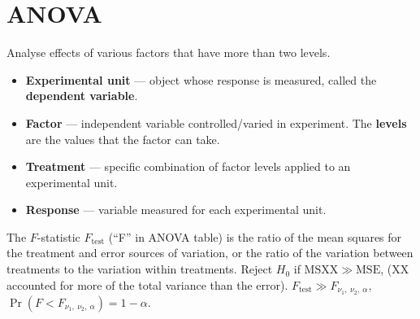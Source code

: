 \documentclass{article}
\begin{document}
\section{ANOVA}
Analyse effects of various factors that have more than two levels.
\begin{itemize}
    \item \textbf{Experimental unit} --- object whose response is measured, called the \textbf{dependent variable}.
    \item \textbf{Factor} --- independent variable controlled/varied in experiment. The \textbf{levels} are the values that the factor can take.
    \item \textbf{Treatment} --- specific combination of factor levels applied to an experimental unit.
    \item \textbf{Response} --- variable measured for each experimental unit.
\end{itemize}
The \(F\)-statistic \(F_{\mathrm{test}}\) (``F'' in ANOVA table) is the ratio of the mean squares for the treatment and error sources of variation,
or the ratio of the variation between treatments to the variation within treatments.
Reject \(H_0\) if \(\mathrm{MSXX} \gg \mathrm{MSE}\), (XX accounted for more of the total variance than the error).
\(F_{\mathrm{test}} \gg F_{\nu_1,\: \nu_2,\: \alpha}\),
\(\Pr{\left( F < F_{\nu_1,\: \nu_2,\: \alpha} \right)} = 1 - \alpha\).
\end{document}
